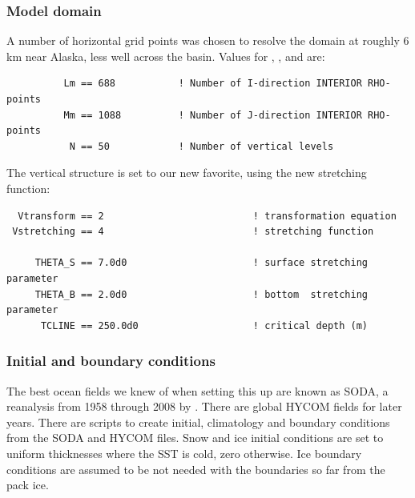 \subsubsection{Model domain}
A number of horizontal grid points was chosen to resolve the
domain at roughly 6 km near Alaska, less well across the basin. Values
for , , and  are:
\begin{verbatim}
          Lm == 688           ! Number of I-direction INTERIOR RHO-points
          Mm == 1088          ! Number of J-direction INTERIOR RHO-points
           N == 50            ! Number of vertical levels
\end{verbatim}
The vertical structure is set to our new favorite, using the new
stretching function:
\begin{verbatim}
  Vtransform == 2                          ! transformation equation
 Vstretching == 4                          ! stretching function

     THETA_S == 7.0d0                      ! surface stretching parameter
     THETA_B == 2.0d0                      ! bottom  stretching parameter
      TCLINE == 250.0d0                    ! critical depth (m)
\end{verbatim}

\subsubsection{Initial and boundary conditions}
The best ocean fields we knew of when setting this up are known as SODA, a
reanalysis from 1958 through 2008 by
\citet{Carton_2005}. There are global HYCOM fields for later years.
There are  scripts to create initial, climatology and
boundary conditions from the SODA and HYCOM files. Snow and ice initial
conditions are set to uniform thicknesses where the SST is cold, zero
otherwise. Ice boundary conditions are assumed to be not needed with the
boundaries so far from the pack ice.

